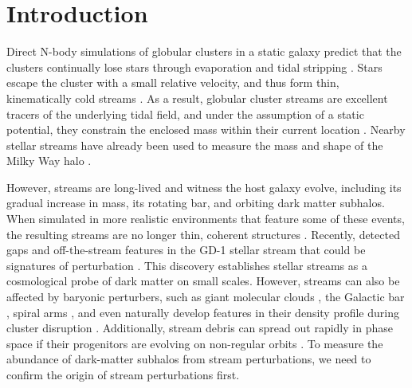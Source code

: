 \documentclass[twocolumn]{aastex62}
\begin{document}
\section{Introduction}
\label{sec:intro}

Direct N-body simulations of globular clusters in a static galaxy predict that the clusters continually lose stars through evaporation and tidal stripping \citep[e.g.,][]{Baumgardt:2003}.
Stars escape the cluster with a small relative velocity, and thus form thin, kinematically cold streams \citep[e.g.,][]{Combes:1999}.
As a result, globular cluster streams are excellent tracers of the underlying tidal field, and under the assumption of a static potential, they constrain the enclosed mass within their current location \citep{Bonaca:2018}.
Nearby stellar streams have already been used to measure the mass and shape of the Milky Way halo \citep[e.g.,][]{Koposov:2010, Kupper:2015, Bovy:2016}.

However, streams are long-lived and witness the host galaxy evolve, including its gradual increase in mass, its rotating bar, and orbiting dark matter subhalos.
When simulated in more realistic environments that feature some of these events, the resulting streams are no longer
thin, coherent structures \citep[e.g.,][]{Bonaca:2014, Ngan:2015, Price-Whelan:2016b}. Recently, \citet{Price-Whelan:2018} detected gaps and off-the-stream features in the GD-1 stellar stream that could be signatures of perturbation \citep{Bonaca:2018b}.
This discovery establishes stellar streams as a cosmological probe of dark matter on small scales.
However, streams can also be affected by baryonic perturbers, such as giant molecular clouds \citep{Amorisco:2016}, the Galactic bar \citep{Pearson:2017}, spiral arms \citep{Banik:2019}, and even naturally develop features in their density profile during cluster disruption \citep[e.g.,][]{Kupper:2008, Just:2009}. Additionally, stream debris can spread out rapidly in phase space if their progenitors are evolving on non-regular orbits \citep[e.g.,][]{Pearson:2015, Fardal:2015, Price-Whelan:2016}.
To measure the abundance of dark-matter subhalos from stream perturbations, we need to confirm the origin of stream perturbations first.
\end{document}
